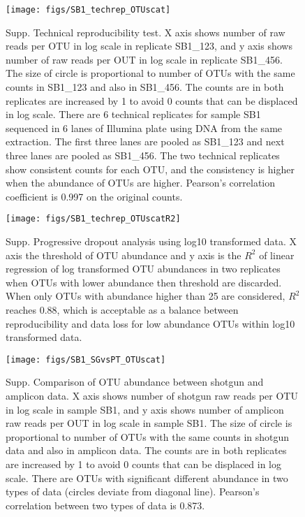 \documentclass[12pt]{article}
\begin{document}
\begin{figure}[tbph!]
  \centering
  \texttt{[image: figs/SB1\_techrep\_OTUscat]}

  \caption[Technical reproducibility test]{Supp. Technical
  reproducibility test. X axis shows number of raw reads per OTU in
  log scale in replicate SB1\_123, and y axis shows number of raw
  reads per OUT in log scale in replicate SB1\_456. The size of circle
  is proportional to number of OTUs with the same counts in SB1\_123
  and also in SB1\_456. The counts are in both replicates are
  increased by 1 to avoid 0 counts that can be displaced in log
  scale. There are 6 technical replicates for sample SB1 sequenced in
  6 lanes of Illumina plate using DNA from the same extraction. The
  first three lanes are pooled as SB1\_123 and next three lanes are
  pooled as SB1\_456. The two technical replicates show consistent
  counts for each OTU, and the consistency is higher when the
  abundance of OTUs are higher. Pearson's correlation coefficient is
  0.997 on the original counts.}

  \label{fig:SB1_techrep_OTUscat}
\end{figure}

\begin{figure}[tbph!]
  \centering
  \texttt{[image: figs/SB1\_techrep\_OTUscatR2]}

  \caption[Progressive dropout analysis using log10 transformed
  data]{Supp. Progressive dropout analysis using log10 transformed
  data. X axis the threshold of OTU abundance and y axis is the $R^2$
  of linear regression of log transformed OTU abundances in two
  replicates when OTUs with lower abundance then threshold are
  discarded. When only OTUs with abundance higher than 25 are
  considered, $R^2$ reaches 0.88, which is acceptable as a balance
  between reproducibility and data loss for low abundance OTUs within
  log10 transformed data.}

  \label{fig:SB1_techrep_OTUscatR2}
\end{figure}

\begin{figure}[tbph!]
  \centering
  \texttt{[image: figs/SB1\_SGvsPT\_OTUscat]}

  \caption[Comparison of OTU abundance between shotgun and amplicon
  data in sample SB1]{Supp. Comparison of OTU abundance between
  shotgun and amplicon data. X axis shows number of shotgun raw reads
  per OTU in log scale in sample SB1, and y axis shows number of
  amplicon raw reads per OUT in log scale in sample SB1. The size of
  circle is proportional to number of OTUs with the same counts in
  shotgun data and also in amplicon data. The counts are in both
  replicates are increased by 1 to avoid 0 counts that can be
  displaced in log scale. There are OTUs with significant different
  abundance in two types of data (circles deviate from diagonal
  line). Pearson's correlation between two types of data is
  0.873.}  \label{fig:SB1_SGvsPT_OTUscat}
\end{figure}
\end{document}
